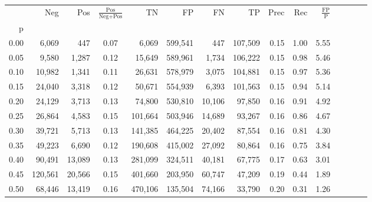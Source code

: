 \begin{tabular}{rrrcrrrrrrrrrrr}
\toprule
{} &      Neg &     Pos & $\frac{\text{Pos}}{\text{Neg}+\text{Pos}}$ &       TN &       FP &       FN &       TP &  Prec &   Rec & $\frac{\text{FP}}{\text{P}}$ \\
p    &          &         &                                            &          &          &          &          &       &       &                              \\
\midrule
0.00 &    6,069 &     447 &                                       0.07 &    6,069 &  599,541 &      447 &  107,509 &  0.15 &  1.00 &                         5.55 \\
0.05 &    9,580 &   1,287 &                                       0.12 &   15,649 &  589,961 &    1,734 &  106,222 &  0.15 &  0.98 &                         5.46 \\
0.10 &   10,982 &   1,341 &                                       0.11 &   26,631 &  578,979 &    3,075 &  104,881 &  0.15 &  0.97 &                         5.36 \\
0.15 &   24,040 &   3,318 &                                       0.12 &   50,671 &  554,939 &    6,393 &  101,563 &  0.15 &  0.94 &                         5.14 \\
0.20 &   24,129 &   3,713 &                                       0.13 &   74,800 &  530,810 &   10,106 &   97,850 &  0.16 &  0.91 &                         4.92 \\
0.25 &   26,864 &   4,583 &                                       0.15 &  101,664 &  503,946 &   14,689 &   93,267 &  0.16 &  0.86 &                         4.67 \\
0.30 &   39,721 &   5,713 &                                       0.13 &  141,385 &  464,225 &   20,402 &   87,554 &  0.16 &  0.81 &                         4.30 \\
0.35 &   49,223 &   6,690 &                                       0.12 &  190,608 &  415,002 &   27,092 &   80,864 &  0.16 &  0.75 &                         3.84 \\
0.40 &   90,491 &  13,089 &                                       0.13 &  281,099 &  324,511 &   40,181 &   67,775 &  0.17 &  0.63 &                         3.01 \\
0.45 &  120,561 &  20,566 &                                       0.15 &  401,660 &  203,950 &   60,747 &   47,209 &  0.19 &  0.44 &                         1.89 \\
0.50 &   68,446 &  13,419 &                                       0.16 &  470,106 &  135,504 &   74,166 &   33,790 &  0.20 &  0.31 &                         1.26 \\

\end{tabular}

